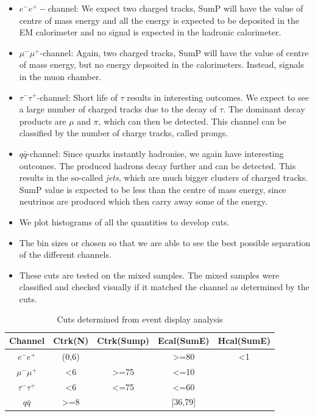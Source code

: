\documentclass[10pt]{beamer}
\begin{document}
\begin{frame}
\begin{itemize}
  \item $e^-e^+-$channel: We expect two charged tracks, SumP will have the value of centre of mass energy and all the energy is expected to be deposited in the EM calorimeter and no signal is expected in the hadronic calorimeter.
  \item $\mu^-\mu^+$-channel: Again, two charged tracks, SumP will have the value of centre of mass energy, but no energy depsoited in the calorimeters. Instead, signals in the muon chamber.
  \item $\tau^-\tau^+$-channel: Short life of $\tau$ results in interesting outcomes. We expect to see a large number of charged tracks due to the decay of $\tau$. The dominant decay products are $\mu$ and $\pi$, which can then be detected. This channel can be classified by the number of charge tracks, called prongs.
  \item $q\bar{q}$-channel: Since quarks instantly hadronise, we again have interesting outcomes. The produced hadrons decay further and can be detected. This results in the so-called \textit{jets}, which are much bigger clusters of charged tracks. SumP value is expected to be less than the centre of mass energy, since neutrinos are produced which then carry away some of the energy.
\end{itemize}
\end{frame}

\begin{frame}
\begin{itemize}
  \item We plot histograms of all the quantities to develop cuts.
  \item The bin sizes or chosen so that we are able to see the best possible separation of the different channels.
  \item These cuts are tested on the mixed samples. The mixed samples were classified and checked visually if it matched the channel as determined by the cuts.
\end{itemize}
\begin{table}[h!]
  \centering
  \begin{tabular}{c|cccc}
  \hline
  Channel        & Ctrk(N)          & Ctrk(Sump)        & Ecal(SumE)        & Hcal(SumE)   \\
  \hline
  $e^-e^+$       & (0,6)            &                   & \textgreater{}=80 & \textless{}1 \\
  $\mu^-\mu^+$   & \textless{}6     & \textgreater{}=75 & \textless{}=10    &              \\
  $\tau^-\tau^+$ & \textless{}6     & \textless{}=75    & \textless{}=60    &              \\
  $q\bar{q}$     & \textgreater{}=8 &                   & {[}36,79{]}       &             \\ \hline
  \end{tabular}
  \caption{Cuts determined from event display analysis}
  \label{table:cuts}
\end{table}
\end{frame}
\end{document}
